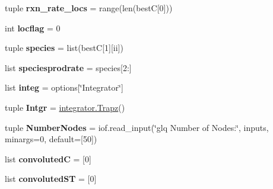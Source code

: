 \begin{DoxyCompactItemize}
\item 
\hypertarget{namespacechemtable__io_afec0d7a789e8729bee99990ada6c8e28}{
tuple {\bfseries rxn\_\-rate\_\-locs} = range(len(bestC\mbox{[}0\mbox{]}))}
\label{dc/dad/namespacechemtable__io_afec0d7a789e8729bee99990ada6c8e28}

\item 
\hypertarget{namespacechemtable__io_ab30790126193db5e0889e9c620ddaf47}{
int {\bfseries locflag} = 0}
\label{dc/dad/namespacechemtable__io_ab30790126193db5e0889e9c620ddaf47}

\item 
\hypertarget{namespacechemtable__io_ae2fe2eb46ed6687f408b68e6eba4dc42}{
tuple {\bfseries species} = list(bestC\mbox{[}1\mbox{]}\mbox{[}ii\mbox{]})}
\label{dc/dad/namespacechemtable__io_ae2fe2eb46ed6687f408b68e6eba4dc42}

\item 
\hypertarget{namespacechemtable__io_aab8b364a0614af5494b8e2d056eed851}{
list {\bfseries speciesprodrate} = species\mbox{[}2:\mbox{]}}
\label{dc/dad/namespacechemtable__io_aab8b364a0614af5494b8e2d056eed851}

\item 
\hypertarget{namespacechemtable__io_a5260348aee3d26a355c5a06e04490029}{
list {\bfseries integ} = options\mbox{[}\char`\"{}Integrator\char`\"{}\mbox{]}}
\label{dc/dad/namespacechemtable__io_a5260348aee3d26a355c5a06e04490029}

\item 
\hypertarget{namespacechemtable__io_a76530767a345cd2f4e75e025caa17a1d}{
tuple {\bfseries Intgr} = \hyperlink{classintegrator_1_1Trapz}{integrator.Trapz}()}
\label{dc/dad/namespacechemtable__io_a76530767a345cd2f4e75e025caa17a1d}

\item 
\hypertarget{namespacechemtable__io_a20004bc7ee51aa97410e2fc1e5c5b63d}{
tuple {\bfseries NumberNodes} = iof.read\_\-input(\char`\"{}glq Number of Nodes:\char`\"{}, inputs, minargs=0, default=\mbox{[}50\mbox{]})}
\label{dc/dad/namespacechemtable__io_a20004bc7ee51aa97410e2fc1e5c5b63d}

\item 
\hypertarget{namespacechemtable__io_a31b3f64ef13f79527c755e739e885180}{
list {\bfseries convolutedC} = \mbox{[}0\mbox{]}}
\label{dc/dad/namespacechemtable__io_a31b3f64ef13f79527c755e739e885180}

\item 
\hypertarget{namespacechemtable__io_a53a99e5fa8820bd0773297db7439676b}{
list {\bfseries convolutedST} = \mbox{[}0\mbox{]}}
\label{dc/dad/namespacechemtable__io_a53a99e5fa8820bd0773297db7439676b}


\end{DoxyCompactItemize}
